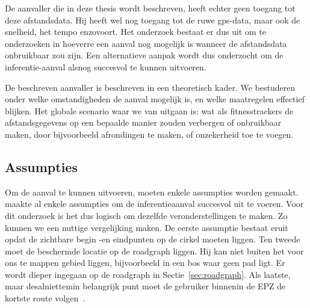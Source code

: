 De aanvaller die in deze thesis wordt beschreven, heeft echter geen toegang tot
deze afstandsdata. Hij heeft wel nog toegang tot de ruwe gps-data, maar ook de
snelheid, het tempo enzovoort. Het onderzoek bestaat er dus uit om te
onderzoeken in hoeverre een aanval nog mogelijk is wanneer de afstandsdata
onbruikbaar zou zijn. Een alternatieve aanpak wordt dus onderzocht om de
inferentie-aanval alsnog succesvol te kunnen uitvoeren.

De beschreven aanvaller is beschreven in een theoretisch kader. We bestuderen
onder welke omstandigheden de aanval mogelijk is, en welke maatregelen
effectief blijken. Het globale scenario waar we van uitgaan is: wat als
fitnesstrackers de afstandsgegevens op een bepaalde manier zouden verbergen of
onbruikbaar maken, door bijvoorbeeld afrondingen te maken, of onzekerheid toe
te voegen.

\subsection{Assumpties}
Om de aanval te kunnen uitvoeren, moeten enkele assumpties worden gemaakt.
\citeauthor{Dhondt} maakte al enkele
assumpties om de inferentieaanval succesvol uit te voeren. Voor dit onderzoek
is het dus logisch om dezelfde veronderstellingen te maken. Zo kunnen we een
nuttige vergelijking maken. De eerste assumptie bestaat eruit opdat de
zichtbare begin -en eindpunten op de cirkel moeten liggen. Ten tweede moet de
beschermde locatie op de roadgraph liggen. Hij kan niet buiten het voor ons te
mappen gebied liggen, bijvoorbeeld in een bos waar geen pad ligt. Er wordt
dieper ingegaan op de roadgraph in Sectie~\ref{sec:roadgraph}. Als laatste,
maar desalniettemin belangrijk punt moet de gebruiker binnenin de \ac{EPZ} de
kortste route volgen~\cite{Dhondt}.

